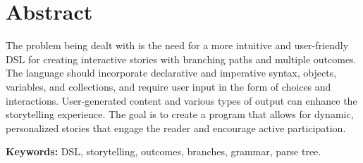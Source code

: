 \chapter*{Abstract}

The problem being dealt with is the need for a more intuitive and user-friendly DSL for creating interactive stories with branching paths and multiple outcomes. The language should incorporate declarative and imperative syntax, objects, variables, and collections, and require user input in the form of choices and interactions. User-generated content and various types of output can enhance the storytelling experience. The goal is to create a program that allows for dynamic, personalized stories that engage the reader and encourage active participation.

\textbf{Keywords: }  DSL, storytelling, outcomes, branches, grammar, parse tree.